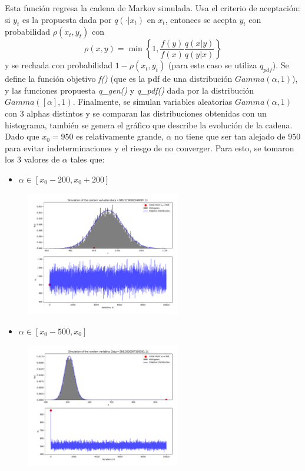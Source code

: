 Esta función regresa la cadena de Markov simulada. Usa el criterio de aceptación: si $y_t$ es la propuesta dada por $q(\cdot|x_t)$ en $x_t$, entonces se acepta $y_t$ con probabilidad $\rho(x_t, y_t)$ con
\begin{equation}
	\rho(x,y) = \min\left\{1, \frac{f(y)}{f(x)} \frac{q(x|y)}{q(y|x)} \right\}
\end{equation}
y se rechada con probabilidad $1-\rho(x_t, y_t)$ (para este caso se utiliza $q_{pdf}$).  Se define la función objetivo \textit{f()} (que es la pdf de una distribución $Gamma(\alpha,1)$), y las funciones propuesta \textit{q\_gen()} y \textit{q\_pdf()} dada por la distribución $Gamma([\alpha],1)$. Finalmente, se simulan variables aleatorias $Gamma(\alpha, 1)$ con $3$ alphas distintos y se comparan las distribuciones obtenidas con un histograma, también se genera el gráfico que describe la evolución de la cadena. Dado que $x_0=950$ es relativamente grande, $\alpha$ no tiene que ser tan alejado de $950$ para evitar indeterminaciones y el riesgo de no converger. Para esto, se tomaron los $3$ valores de $\alpha$ tales que:
\begin{itemize}
	\item $\alpha\in[x_0-200, x_0+200]$
\end{itemize}
\begin{figure}[h!]
	\centering
	\includegraphics[width=0.6\textwidth]{IMAGENES/ex2/example1_ex2.pdf}
\end{figure}

\begin{itemize}
	\item $\alpha\in[x_0-500, x_0]$
\end{itemize}
\begin{figure}[h!]
	\centering
	\includegraphics[width=0.6\textwidth]{IMAGENES/ex2/example2_ex2.pdf}
\end{figure}

